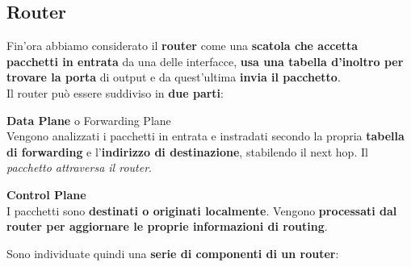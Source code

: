 \documentclass[10pt]{article}
\begin{document}
\subsection{Router}
Fin'ora abbiamo considerato il \textbf{router} come una \textbf{scatola che accetta pacchetti in entrata} da una delle interfacce, \textbf{usa una tabella d'inoltro per trovare la porta} di output e da quest'ultima \textbf{invia il pacchetto}.\\
Il router può essere suddiviso in \textbf{due parti}:
\begin{list}{}{}
	\item \textbf{Data Plane} o Forwarding Plane\\
	Vengono analizzati i pacchetti in entrata e instradati secondo la propria \textbf{tabella di forwarding} e l'\textbf{indirizzo di destinazione}, stabilendo il next hop. Il \textit{pacchetto attraversa il router}.
	\item \textbf{Control Plane}\\
	I pacchetti sono \textbf{destinati o originati localmente}. Vengono \textbf{processati dal router per aggiornare le proprie informazioni di routing}.
\end{list}
Sono individuate quindi una \textbf{serie di componenti di un router}:
\end{document}
